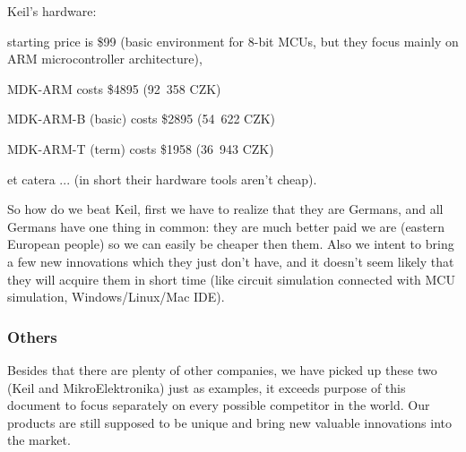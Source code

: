 \documentclass[a4paper,twoside,15pt]{book}
\begin{document}
\begin{dinglist}{73}
                \item Keil's hardware:
                    \begin{dinglist}{75}
                        \item starting price is \$99 (basic environment for 8-bit MCUs, but they focus mainly on ARM microcontroller architecture),
                        \item MDK-ARM costs \$4895 (92~358 CZK)
                        \item MDK-ARM-B (basic) costs \$2895 (54~622 CZK)
                        \item MDK-ARM-T (term) costs \$1958 (36~943 CZK)
                        \item et catera ... (in short their hardware tools aren't cheap).
                    \end{dinglist}
            \end{dinglist}

            So how do we beat Keil, first we have to realize that they are Germans, and all Germans have one thing in common: they are much better paid we are (eastern European people) so we can easily be cheaper then them. Also we intent to bring a few new innovations which they just don't have, and it doesn't seem likely that they will acquire them in short time (like circuit simulation connected with MCU simulation, Windows/Linux/Mac IDE).

        \subsubsection{Others}
            Besides that there are plenty of other companies, we have picked up these two (Keil and MikroElektronika) just as examples, it exceeds purpose of this document to focus separately on every possible competitor in the world. Our products are still supposed to be unique and bring new valuable innovations into the market.

    \clearpage
\end{document}
